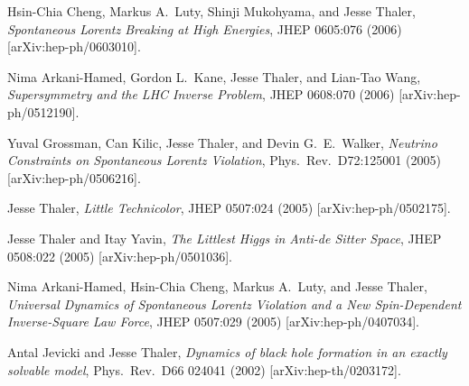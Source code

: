 \begin{list}{[]\addtocounter{jessecount}{-1}}{\leftmargin=3em \itemsep=4pt}
\item
 Hsin-Chia Cheng, Markus A.\ Luty, Shinji Mukohyama, and Jesse Thaler,
\emph{Spontaneous Lorentz Breaking at High Energies},
JHEP 0605:076 (2006)
[arXiv:hep-ph/0603010].

\item
 Nima Arkani-Hamed, Gordon L.\ Kane, Jesse Thaler, and Lian-Tao Wang,
\emph{Supersymmetry and the LHC Inverse Problem},
JHEP 0608:070 (2006)
[arXiv:hep-ph/0512190].

\item
 Yuval Grossman, Can Kilic, Jesse Thaler, and Devin G.\ E.\ Walker,
\emph{Neutrino Constraints on Spontaneous Lorentz Violation},
Phys.\ Rev.\ D72:125001 (2005)
[arXiv:hep-ph/0506216].

\item
 Jesse Thaler,
\emph{Little Technicolor},
JHEP 0507:024 (2005)
[arXiv:hep-ph/0502175].

\item
 Jesse Thaler and Itay Yavin,
\emph{The Littlest Higgs in Anti-de Sitter Space},
JHEP 0508:022 (2005)
[arXiv:hep-ph/0501036].

\item
 Nima Arkani-Hamed, Hsin-Chia Cheng, Markus A.\ Luty, and Jesse Thaler,
\emph{Universal Dynamics of Spontaneous Lorentz Violation and a New Spin-Dependent Inverse-Square Law Force},
JHEP 0507:029 (2005)
[arXiv:hep-ph/0407034].

\item
 Antal Jevicki and Jesse Thaler,
\emph{Dynamics of black hole formation in an exactly solvable model},
Phys.\ Rev.\ D66 024041 (2002)
[arXiv:hep-th/0203172].

\end{list}
